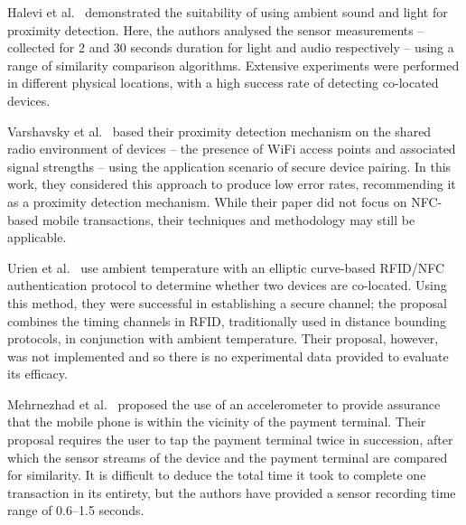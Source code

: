 \documentclass{article}
\begin{document}
Halevi et al.\ \cite{Halevi2012} demonstrated the suitability of using ambient sound and light for proximity detection.  Here, the authors analysed the sensor measurements -- collected for 2 and 30 seconds duration for light and audio respectively -- using a range of similarity comparison algorithms.  Extensive experiments were performed in different physical locations, with a high success rate of detecting co-located devices.

Varshavsky et al.\ \cite{Varshavsky2007} based their proximity detection mechanism on the shared radio environment of devices -- the presence of WiFi access points and associated signal strengths -- using the application scenario of secure device pairing.  In this work, they considered this approach to produce low error rates, recommending it as a proximity detection mechanism.  While their paper did not focus on NFC-based mobile transactions, their techniques and methodology may still be applicable.

Urien et al.\ \cite{Urien201428} use ambient temperature with an elliptic curve-based RFID/NFC authentication protocol to determine whether two devices are co-located.  Using this method, they were successful in establishing a secure channel; the proposal combines the timing channels in RFID, traditionally used in distance bounding protocols, in conjunction with ambient temperature.  Their proposal, however, was not implemented and so there is no experimental data provided to evaluate its efficacy.

Mehrnezhad et al.\ \cite{mehrnezhad2014tap} proposed the use of an accelerometer to provide assurance that the mobile phone is within the vicinity of the payment terminal.  Their proposal requires the user to tap the payment terminal twice in succession, after which the sensor streams of the device and the payment terminal are compared for similarity.  It is difficult to deduce the total time it took to complete one transaction in its entirety, but the authors have provided a sensor recording time range of 0.6--1.5 seconds.
\end{document}
